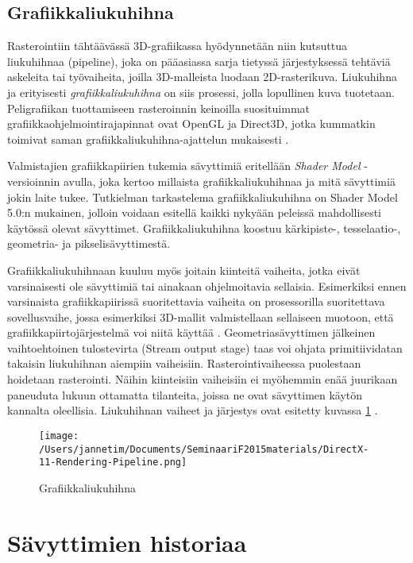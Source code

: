 \documentclass[finnish]{tktltiki2}
\theoremstyle{definition}
\theoremstyle{remark}
\begin{document}
\subsection{Grafiikkaliukuhihna}
Rasterointiin tähtäävässä 3D-grafiikassa hyödynnetään niin kutsuttua liukuhihnaa (pipeline), joka on pääasiassa sarja tietyssä järjestyksessä tehtäviä askeleita tai työvaiheita, joilla 3D-malleista luodaan 2D-rasterikuva. Liukuhihna ja erityisesti \emph{grafiikkaliukuhihna} on siis prosessi, jolla lopullinen kuva tuotetaan. Peligrafiikan tuottamiseen rasteroinnin keinoilla suosituimmat grafiikkaohjelmointirajapinnat ovat OpenGL ja Direct3D, jotka kummatkin toimivat saman grafiikkaliukuhihna-ajattelun mukaisesti \cite{Krh15} \cite{Mic11}.

Valmistajien grafiikkapiirien tukemia sävyttimiä eritellään \emph{Shader Model} -versioinnin avulla, joka kertoo millaista grafiikkaliukuhihnaa ja mitä sävyttimiä jokin laite tukee. Tutkielman tarkastelema grafiikkaliukuhihna on Shader Model 5.0:n mukainen, jolloin voidaan esitellä kaikki nykyään peleissä mahdollisesti käytössä olevat sävyttimet. Grafiikkaliukuhihna koostuu kärkipiste-, tesselaatio-, geometria- ja pikselisävyttimestä.

Grafiikkaliukuhihnaan kuuluu myös joitain kiinteitä vaiheita, jotka eivät varsinaisesti ole sävyttimiä tai ainakaan ohjelmoitavia sellaisia. Esimerkiksi ennen varsinaista grafiikkapiirissä suoritettavia vaiheita on prosessorilla suoritettava sovellusvaihe, jossa esimerkiksi 3D-mallit valmistellaan sellaiseen muotoon, että grafiikkapiirtojärjestelmä voi niitä käyttää \cite[s. 164-165]{Puh08}. Geometriasävyttimen jälkeinen vaihtoehtoinen tulostevirta (Stream output stage) taas voi ohjata primitiividatan takaisin liukuhihnan aiempiin vaiheisiin. Rasterointivaiheessa puolestaan hoidetaan rasterointi. Näihin kiinteisiin vaiheisiin ei myöhemmin enää juurikaan paneuduta lukuun ottamatta tilanteita, joissa ne ovat sävyttimen käytön kannalta oleellisia. Liukuhihnan vaiheet ja järjestys ovat esitetty kuvassa \ref{gpipe} \cite{Mic11}.

\begin{figure}[!htb]
\centering
\texttt{[image: /Users/jannetim/Documents/SeminaariF2015materials/DirectX-11-Rendering-Pipeline.png]}
\caption{Grafiikkaliukuhihna}
\label{gpipe}
\end{figure}

\section{Sävyttimien historiaa}
\end{document}
